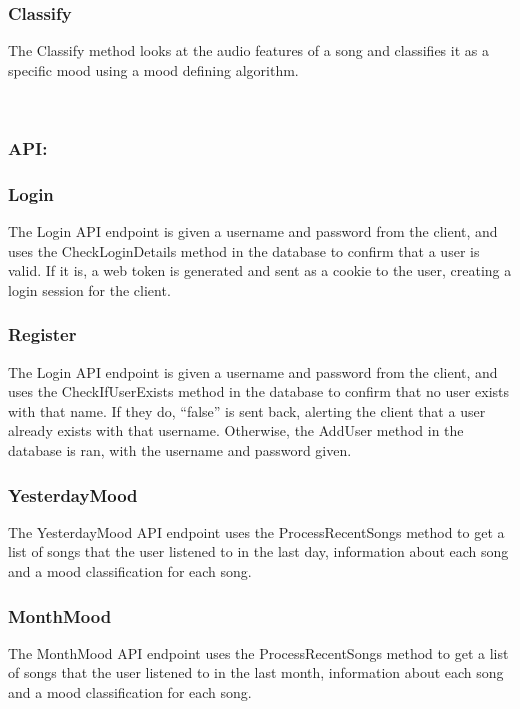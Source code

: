 \documentclass[10pt]{report}
\begin{document}
\subsubsection{Classify}
The Classify method looks at the audio features of a song and classifies it as a specific mood using a mood defining algorithm.


\leavevmode \\

\subsubsection{API:}

\hrulefill

\subsubsection{Login}
The Login API endpoint is given a username and password from the client, and uses the CheckLoginDetails method in the database to confirm that a user is valid. If it is, a web token is generated and sent as a cookie to the user, creating a login session for the client.

\subsubsection{Register}
The Login API endpoint is given a username and password from the client, and uses the CheckIfUserExists method in the database to confirm that no user exists with that name. If they do, “false” is sent back, alerting the client that a user already exists with that username. Otherwise, the AddUser method in the database is ran, with the username and password given.

\subsubsection{YesterdayMood}
The YesterdayMood API endpoint uses the ProcessRecentSongs method to get a list of songs that the user listened to in the last day, information about each song and a mood classification for each song.

\subsubsection{MonthMood}
The MonthMood API endpoint uses the ProcessRecentSongs method to get a list of songs that the user listened to in the last month, information about each song and a mood classification for each song.
\end{document}
